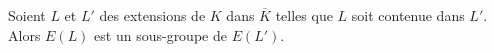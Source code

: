 
\begin{proposition}
    Soient $L$ et $L'$ des extensions de $K$ dans $\overline{K}$ telles que $L$ soit contenue dans $L'$. Alors $E(L)$ est un sous-groupe de $E(L')$.
\end{proposition}

\begin{demonstration}
    
\end{demonstration}
